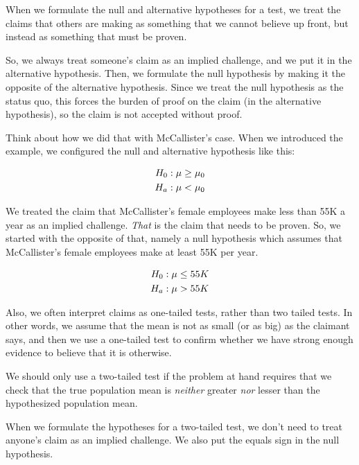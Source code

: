 \documentclass[../../../main.tex]{subfiles}
\begin{document}
When we formulate the null and alternative hypotheses for a test, we treat the claims that others are making as something that we cannot believe up front, but instead as something that must be proven. 

So, we always treat someone's claim as an implied challenge, and we put it in the alternative hypothesis. Then, we formulate the null hypothesis by making it the opposite of the alternative hypothesis. Since we treat the null hypothesis as the status quo, this forces the burden of proof on the claim (in the alternative hypothesis), so the claim is not accepted without proof.

Think about how we did that with McCallister's case. When we introduced the example, we configured the null and alternative hypothesis like this:

\begin{align*}
  \NullHyp/: \populationmean \geq \HypPopMean/ \\
  \AltHyp/: \populationmean < \HypPopMean/
\end{align*}

\noindent
We treated the claim that McCallister's female employees make less than 55K a year as an implied challenge. \emph{That} is the claim that needs to be proven. So, we started with the opposite of that, namely a null hypothesis which assumes that McCallister's female employees make at least 55K per year.

\begin{align*}
  \NullHyp/: \populationmean \leq 55K \\
  \AltHyp/: \populationmean > 55K
\end{align*}

\noindent
Also, we often interpret claims as one-tailed tests, rather than two tailed tests. In other words, we assume that the mean is not as small (or as big) as the claimant says, and then we use a one-tailed test to confirm whether we have strong enough evidence to believe that it is otherwise. 

We should only use a two-tailed test if the problem at hand requires that we check that the true population mean is \emph{neither} greater \emph{nor} lesser than the hypothesized population mean.

When we formulate the hypotheses for a two-tailed test, we don't need to treat anyone's claim as an implied challenge. We also put the equals sign in the null hypothesis.
\end{document}
